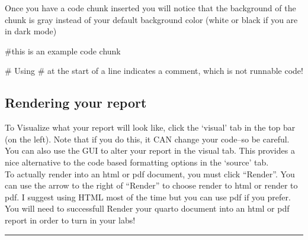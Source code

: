 \documentclass[
  letterpaper,
  DIV=11,
  numbers=noendperiod]{scrartcl}
\newenvironment{Shaded}{\begin{snugshade}}{\end{snugshade}}
\newcommand{\CommentTok}[1]{\textcolor[rgb]{0.37,0.37,0.37}{#1}}
\begin{document}
Once you have a code chunk inserted you will notice that the background
of the chunk is gray instead of your default background color (white or
black if you are in dark mode)

\begin{Shaded}
\begin{Highlighting}[]
\CommentTok{\#this is an example code chunk}

\CommentTok{\# Using \textquotesingle{}\#\textquotesingle{} at the start of a line indicates a comment, which is not runnable code!}
\end{Highlighting}
\end{Shaded}

\hypertarget{rendering-your-report}{%
\subsection{\texorpdfstring{\textbf{Rendering your
report}}{Rendering your report}}\label{rendering-your-report}}

To Visualize what your report will look like, click the `visual' tab in
the top bar (on the left). Note that if you do this, it CAN change your
code--so be careful. You can also use the GUI to alter your report in
the visual tab. This provides a nice alternative to the code based
formatting options in the `source' tab.\\

To actually render into an html or pdf document, you must click
``Render''. You can use the arrow to the right of ``Render'' to choose
render to html or render to pdf. I suggest using HTML most of the time
but you can use pdf if you prefer. You will need to successfull Render
your quarto document into an html or pdf report in order to turn in your
labs!

\begin{center}\rule{0.5\linewidth}{0.5pt}\end{center}
\end{document}
